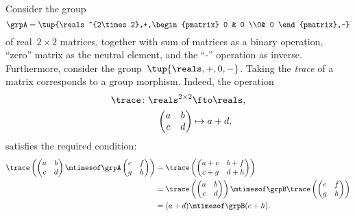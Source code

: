 \begin{example}
    Consider the group
    \begin{equation}
        \grpA=\tup{\reals^{2\times 2},+,\begin{pmatrix}
                0 & 0 \\0& 0
            \end{pmatrix},-}
    \end{equation} of real~$2\times 2$ matrices, together with sum of matrices as a binary operation, ``zero'' matrix as the neutral element, and the ``-'' operation as inverse.
    Furthermore, consider the group~$\tup{\reals,+,0,-}$.
    Taking the \emph{trace} of a matrix corresponds to a group morphism.
    Indeed, the operation
    \begin{equation*}
        \begin{aligned}
            \trace\colon \reals^{2\times 2} & \fto \reals, \\
            \begin{pmatrix}
                a & b \\
                c & d
            \end{pmatrix}                 & \mapsto a+d,
        \end{aligned}
    \end{equation*}
    satisfies the required condition:
    \begin{equation*}
        \begin{aligned}
            \trace \left(
            \begin{pmatrix}
                a & b \\
                c & d
            \end{pmatrix} \mtimesof\grpA
            \begin{pmatrix}
                e & f \\
                g & h
            \end{pmatrix}
            \right) & =
            \trace
            \left(
            \begin{pmatrix}
                a+e & b+f \\
                c+g & d+h
            \end{pmatrix}
            \right)                               \\
                    & =\trace \left(
            \begin{pmatrix}
                a & b \\
                c & d
            \end{pmatrix}\right)\mtimesof\grpB \trace \left(
            \begin{pmatrix}
                e & f \\
                g & h
            \end{pmatrix}
            \right)                               \\
                    & =(a+d)\mtimesof\grpB (e+h).
        \end{aligned}
    \end{equation*}
\end{example}
